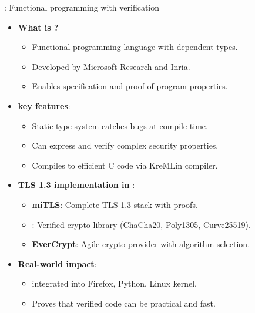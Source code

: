 \documentclass[aspectratio=169, lualatex, handout]{beamer}
\begin{document}
\begin{frame}{\fstar: Functional programming with verification}
	\begin{itemize}
		\item \textbf{What is \fstar?}
		      \begin{itemize}
			      \item Functional programming language with dependent types.
			      \item Developed by Microsoft Research and Inria.
			      \item Enables specification and proof of program properties.
		      \end{itemize}
		\item \textbf{\fstar key features}:
		      \begin{itemize}
			      \item Static type system catches bugs at compile-time.
			      \item Can express and verify complex security properties.
			      \item Compiles to efficient C code via KreMLin compiler.
		      \end{itemize}
		\item \textbf{TLS 1.3 implementation in \fstar}:
		      \begin{itemize}
			      \item \textbf{miTLS}: Complete TLS 1.3 stack with proofs.
			      \item \textbf{\haclstar}: Verified crypto library (ChaCha20, Poly1305, Curve25519).
			      \item \textbf{EverCrypt}: Agile crypto provider with algorithm selection.
		      \end{itemize}
		\item \textbf{Real-world impact}:
		      \begin{itemize}
			      \item \haclstar integrated into Firefox, Python, Linux kernel.
			      \item Proves that verified code can be practical and fast.
		      \end{itemize}
	\end{itemize}
\end{frame}
\end{document}
